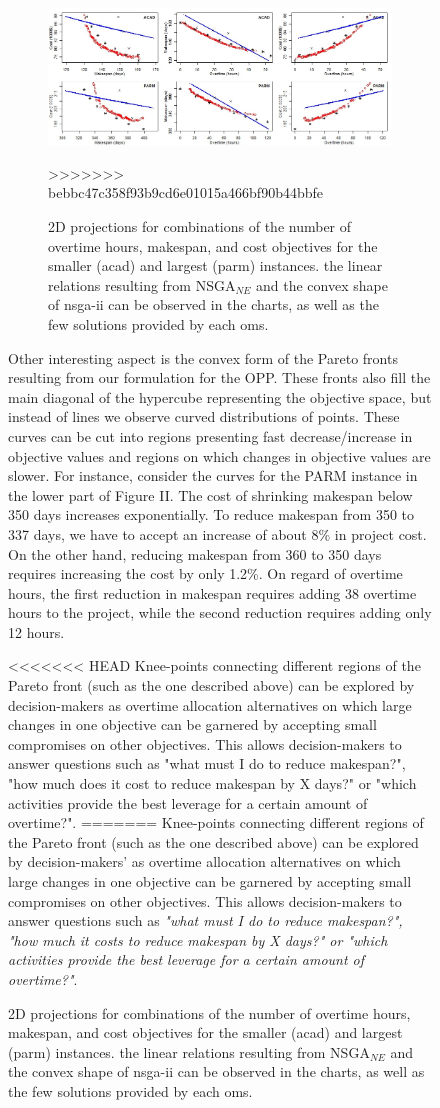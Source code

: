 \documentclass[conference]{IEEEtran}
\begin{document}
\begin{figure}
\begin{figure}
\centering
\includegraphics[width=18cm]{lessonslearned.jpg}
\caption{2D projections for combinations of the number of overtime hours, makespan, and cost objectives for the smaller (acad) and largest (parm) instances. the linear relations resulting from NSGA$_{NE}$ and the convex shape of nsga-ii can be observed in the charts, as well as the few solutions provided by each oms.}
>>>>>>> bebbc47c358f93b9cd6e01015a466bf90b44bbfe
\end{figure}

Other interesting aspect is the convex form of the Pareto fronts resulting from our formulation for the OPP. These fronts also fill the main diagonal of the hypercube representing the objective space, but instead of lines we observe curved distributions of points. These curves can be cut into regions presenting fast decrease/increase in objective values and regions on which changes in objective values are slower. For instance, consider the curves for the PARM instance in the lower part of Figure II. The cost of shrinking makespan below 350 days increases exponentially. To reduce makespan from 350 to 337 days, we have to accept an increase of about 8\% in project cost. On the other hand, reducing makespan from 360 to 350 days requires increasing the cost by only 1.2\%. On regard of overtime hours, the first reduction in makespan requires adding 38 overtime hours to the project, while the second reduction requires adding only 12 hours. 

<<<<<<< HEAD
Knee-points connecting different regions of the Pareto front (such as the one described above) can be explored by decision-makers as overtime allocation alternatives on which large changes in one objective can be garnered by accepting small compromises on other objectives. This allows decision-makers to answer questions such as "what must I do to reduce makespan?", "how much does it cost to reduce makespan by X days?" or "which activities provide the best leverage for a certain amount of overtime?".
=======
Knee-points connecting different regions of the Pareto front (such as the one described above) can be explored by decision-makers' as overtime allocation alternatives on which large changes in one objective can be garnered by accepting small compromises on other objectives. This allows decision-makers to answer questions such as \textit{"what must I do to reduce makespan?", "how much it costs to reduce makespan by X days?" or "which activities provide the best leverage for a certain amount of overtime?"}.


\end{figure}
\end{document}
